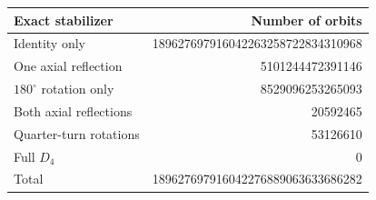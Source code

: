\begin{tabular}{lr}
\toprule
Exact stabilizer & Number of orbits \\
\midrule
Identity only & 189627697916042263258722834310968 \\
One axial reflection & 5101244472391146 \\
$180^\circ$ rotation only & 8529096253265093 \\
Both axial reflections & 20592465 \\
Quarter-turn rotations & 53126610 \\
Full $D_4$ & 0 \\
Total & 189627697916042276889063633686282 \\
\bottomrule
\end{tabular}
